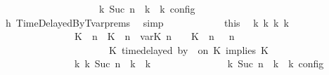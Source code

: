 \begin{isabellebody}
\ \ \ \ \ \ \ \ \ \ \ \ \ \ \ \ {\isasymand}\ {\isasymrho}\ {\isasymin}\ {\isasymlbrakk}\ {\isasymGamma}\isactrlsub k{\isacharcomma}\ Suc\ n\ {\isasymturnstile}\ {\isasymPsi}\isactrlsub k\ {\isasymtriangleright}\ {\isasymPhi}\isactrlsub k\ {\isasymrbrakk}\isactrlsub c\isactrlsub o\isactrlsub n\isactrlsub f\isactrlsub i\isactrlsub g{\isacartoucheclose}\isanewline
\ \ \ \ \ \ \ \ \ \ \ \ \isamarkupfalse%
\ h{}\ TimeDelayedByTvar{\isachardot}prems\ \isamarkupfalse%
\ simp\isanewline
\ \ \ \ \ \ \ \ \ \ \isamarkupfalse%
\ this\ \isamarkupfalse%
\ {\isasymGamma}\isactrlsub k\ {\isasymPsi}\isactrlsub k\ {\isasymPhi}\isactrlsub k\ k\ \ {\isacartoucheopen}\isanewline
\ \ \ \ \ \ \ \ \ \ \ \ \ \ {\isacharparenleft}\ {\isacharparenleft}{\isacharparenleft}{\isacharparenleft}K\ {\isasymUp}\ n{\isacharparenright}\ {\isacharhash}\ {\isacharparenleft}K\ {\isasymDown}\ n\ {\isacharat}{\isasymsharp}\ {\isasymlparr}{\isasymtau}\isactrlsub v\isactrlsub a\isactrlsub r{\isacharparenleft}K\ n{\isacharparenright}\ {\isasymoplus}\ {\isasymdelta}{\isasymtau}{\isasymrparr}{\isacharparenright}\ {\isacharhash}\ {\isacharparenleft}K\ {\isasymUp}\ n{\isacharparenright}\ {\isacharhash}\ {\isasymGamma}{\isacharparenright}{\isacharcomma}\ n\isanewline
\ \ \ \ \ \ \ \ \ \ \ \ \ \ \ \ \ \ \ {\isasymturnstile}\ {\isasymPsi}\ {\isasymtriangleright}\ {\isacharparenleft}{\isacharparenleft}K\ time{\isacharminus}delayed{\isasymsharp}\ by\ {\isasymdelta}{\isasymtau}\ on\ K\ implies\ K\ {\isacharhash}\ {\isasymPhi}{\isacharparenright}{\isacharparenright}\isanewline
\ \ \ \ \ \ \ \ \ \ \ \ \ \ \ {\isasymhookrightarrow}\isactrlbsup k\isactrlesup \ {\isacharparenleft}{\isasymGamma}\isactrlsub k{\isacharcomma}\ Suc\ n\ {\isasymturnstile}\ {\isasymPsi}\isactrlsub k\ {\isasymtriangleright}\ {\isasymPhi}\isactrlsub k{\isacharparenright}{\isacharparenright}{\isacartoucheclose}\isanewline
\ \ \ \ \ \ \ \ \ \ \ \ {\isacharasterisk}{\isacharcolon}{\isacartoucheopen}{\isasymrho}\ {\isasymin}\ {\isasymlbrakk}\ {\isasymGamma}\isactrlsub k{\isacharcomma}\ Suc\ n\ {\isasymturnstile}\ {\isasymPsi}\isactrlsub k\ {\isasymtriangleright}\ {\isasymPhi}\isactrlsub k\ {\isasymrbrakk}\isactrlsub c\isactrlsub o\isactrlsub n\isactrlsub f\isactrlsub i\isactrlsub g{\isacartoucheclose}\ \isamarkupfalse%

\end{isabellebody}
